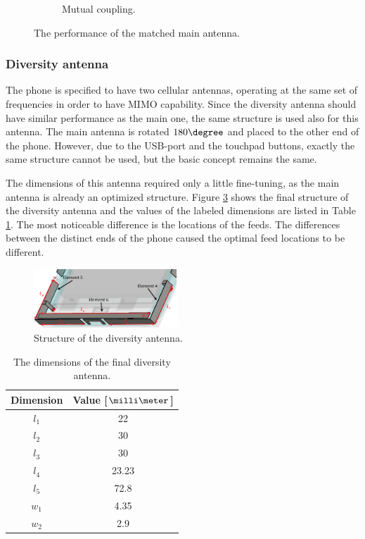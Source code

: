 \begin{figure}[H]
\begin{subfigure}[b]{0.49\textwidth}
        \caption{Mutual coupling.}
        \label{fig:main_final_res_match_coup}
    \end{subfigure}
    \caption{The performance of the matched main antenna.}
    \vspace{-15pt}
\end{figure}


\subsubsection{Diversity antenna}
\label{sec:diversity}
The phone is specified to have two cellular antennas, operating at the same set of frequencies in order to have MIMO capability. Since the diversity antenna should have similar performance as the main one, the same structure is used also for this antenna. The main antenna is rotated $180\degree$ and placed to the other end of the phone. However, due to the USB-port and the touchpad buttons, exactly the same structure cannot be used, but the basic concept remains the same.

The dimensions of this antenna required only a little fine-tuning, as the main antenna is already an optimized structure. Figure \ref{fig:div_final} shows the final structure of the diversity antenna and the values of the labeled dimensions are listed in Table \ref{tab:div_final}. The most noticeable difference is the locations of the feeds. The differences between the distinct ends of the phone caused the optimal feed locations to be different. 
\begin{figure}[H]
    \centering
    \includegraphics[width=0.48\textwidth]{img/diversity_final.eps}
    \caption{Structure of the diversity antenna.}
    \vspace{-5pt}
    \label{fig:div_final}
\end{figure}
\begin{table}[H]
    \vspace{-12pt}
    \centering
    \caption{The dimensions of the final diversity antenna.}
    \label{tab:div_final}
    \vspace{-7pt}
    \begin{tabular}{|c|c|}
        \hline
        \textbf{Dimension} & \textbf{Value [$\milli\meter$]}\\
        \hline
        $l_1$ & 22 \\
        \hline
        $l_2$ & 30\\
        \hline
        $l_3$ & 30 \\
        \hline
        $l_4$ & 23.23 \\
        \hline
        $l_5$ & 72.8 \\
        \hline
        $w_1$ & 4.35\\
        \hline
        $w_2$ & 2.9\\
        \hline
    \end{tabular}
\end{table}

